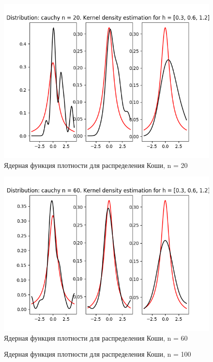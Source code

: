 \documentclass[12pt]{report}
\begin{document}
\begin{center}
    \begin{figure}[H]
 \caption{Ядерная функция плотности для распределения Коши, n = 20}
\includegraphics[width=\textwidth]{../lab_4/pic/kernel/d_cauchy20.png}
\end{figure}
    \begin{figure}[H]
 \caption{Ядерная функция плотности для распределения Коши, n = 60}
\includegraphics[width=\textwidth]{../lab_4/pic/kernel/d_cauchy60.png}
\end{figure}
    \begin{figure}[H]
 \caption{Ядерная функция плотности для распределения Коши, n = 100}

\end{figure}
\end{center}
\end{document}

